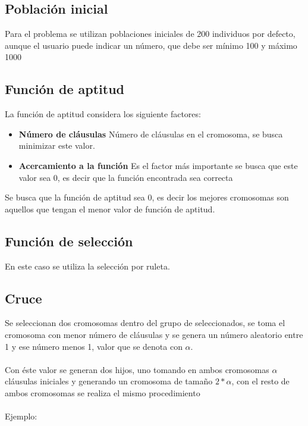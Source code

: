 \documentclass[a4paper]{article}
\begin{document}
\subsection{Población inicial}

Para el problema se utilizan poblaciones iniciales de 200 individuos por defecto, aunque el usuario puede indicar un número, que debe ser mínimo 100 y máximo 1000

\subsection{Función de aptitud}

La función de aptitud considera los siguiente factores:

\begin{itemize}
	\item \textbf{Número de cláusulas} Número de cláusulas en el cromosoma, se busca minimizar este valor.
	\item \textbf{Acercamiento a la función} Es el factor más importante se busca que este valor sea 0, es decir que la función encontrada sea correcta
\end{itemize}

Se busca que la función de aptitud sea 0, es decir los mejores cromosomas son aquellos que tengan el menor valor de función de aptitud.

\subsection{Función de selección}

En este caso se utiliza la selección por ruleta.

\subsection{Cruce}

Se seleccionan dos cromosomas dentro del grupo de seleccionados, se toma el cromosoma con menor número de cláusulas y se genera un número aleatorio entre 1 y ese número menos 1, valor que se denota con $\alpha$.
\\\\
Con éste valor se generan dos hijos, uno tomando en ambos cromosomas $\alpha$ cláusulas iniciales y generando un cromosoma de tamaño $2*\alpha$, con el resto de ambos cromosomas se realiza el mismo procedimiento
\\\\
Ejemplo:
\end{document}
